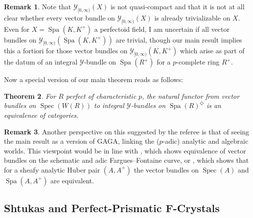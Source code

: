 \documentclass[10pt,twoside]{article}
\numberwithin{equation}{section}
\theoremstyle{plain}
\newtheorem{mythm}{Theorem}[section]
\theoremstyle{definition}
\newtheorem{myrem}[mythm]{Remark}
\DeclareMathOperator{\Spec}{Spec}
\DeclareMathOperator{\Spa}{Spa}
\newcommand{\MCY}{\mathcal{Y}}
\let \diamond \Diamond
\newcommand{\Yco}{\MCY_{[0,\infty)}}
\begin{document}
\begin{myrem}
    Note that \(\Yco(X)\) is not quasi-compact and that it is not at all clear whether every vector bundle on \(\Yco(X)\) is already trivializable on \(X\). Even for \(X=\Spa(K,K^+)\) a perfectoid field, I am uncertain if all vector bundles on \(\Yco(\Spa(K,K^+))\) are trivial, though our main result implies this a fortiori for those vector bundles on \(\Yco(K,K^+)\) which arise as part of the datum of an integral \(\MCY\)-bundle on \(\Spa(R^+)\) for a \(p\)-complete ring \(R^+\).
\end{myrem}

Now a special version of our main theorem reads as follows: 

\begin{mythm}
    For \(R\) perfect of characteristic \(p\), the natural functor from vector bundles on \(\Spec(W(R))\) to integral \(\MCY\)-bundles on \(\Spa(R)^\diamond\) is an equivalence of categories.
\end{mythm}


\begin{myrem}
    Another perspective on this suggested by the referee is that of seeing the main result as a version of GAGA, linking the (\(p\)-adic) analytic and algebraic worlds. This viewpoint would be in line with \cite[8.7.7]{KL15}, which shows equivalence of vector bundles on the schematic and adic Fargues--Fontaine curve, or \cite[2.7.7]{KL15}, which shows that for a sheafy analytic Huber pair \((A,A^+)\) the vector bundles on \(\Spec(A)\) and \(\Spa(A,A^+)\) are equivalent.
\end{myrem}

\subsection*{Shtukas and Perfect-Prismatic F-Crystals}
\end{document}
